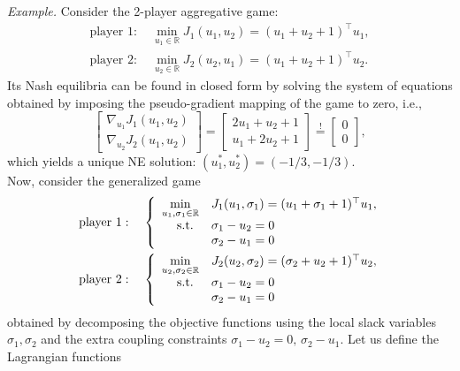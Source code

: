 \documentclass[11pt]{article}
\newcommand{\0}{\mathbf{0}}
\newcommand{\1}{\mathbf{1}}
\begin{document}
{
\textit{Example.} Consider the 2-player aggregative game:
\begin{align*} 
\text{player }1: \quad \min_{u_1 \in \mathbb R}J_1(u_1,u_2) = (u_1+u_2 + 1)^\top u_1,\\
\text{player }2: \quad \min_{u_2 \in \mathbb R} J_2(u_2,u_1) = (u_1+u_2 + 1)^\top u_2.
\end{align*}
Its Nash equilibria can be found in closed form by solving the system of equations obtained by imposing the pseudo-gradient mapping of the game to zero, i.e.,
\begin{equation*}
\left[
\begin{array}{l}
\nabla_{u_1} J_1(u_1,u_2)\\
\nabla_{u_2} J_2(u_1,u_2)
\end{array}
\right]
=
\left[
\begin{array}{l}
2u_1+u_2+1\\
u_1+2u_2+1
\end{array}
\right]
\overset{!}{=}
\left[
\begin{array}{l}
0\\
0
\end{array}
\right],
\end{equation*} 
which yields a unique NE solution: $(u_1^*,u_2^*) = (-1/3,-1/3) $.\\
Now, consider the generalized game
\begin{align*} \
\text{player }1: \quad 
\left\{
\begin{array}{r l}
\displaystyle
\min_{u_1,\sigma_1 \in \mathbb R}& J_1(u_1,\sigma_1) = (u_1+\sigma_1 + 1)^\top u_1,\\
\text{s.t. } & \sigma_1 - u_2 = 0\\
            &  \sigma_2 - u_1 = 0
\end{array}
\right.
\\
\text{player }2: \quad 
\left\{
\begin{array}{r l}
\displaystyle
\min_{u_2,\sigma_2 \in \mathbb R}& J_2(u_2,\sigma_2) = (\sigma_2+u_2 + 1)^\top u_2,\\
\text{s.t. } & \sigma_1 - u_2 = 0\\
            &  \sigma_2 - u_1 = 0
\end{array}
\right.
\end{align*} 
obtained by decomposing the objective functions using the local slack variables $\sigma_1,\sigma_2$ and the extra coupling constraints $\sigma_1 - u_2 = 0, \, \sigma_2 - u_1$. Let us define the Lagrangian functions
\begin{align*}

\end{align*}}
\end{document}
